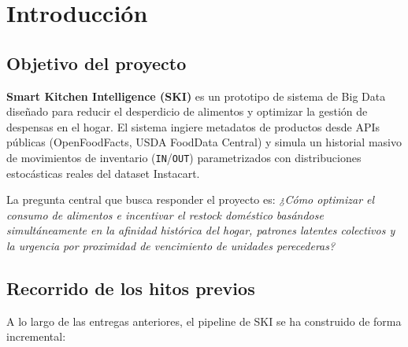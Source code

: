 \documentclass[12pt,a4paper]{article}
\newcommand{\code}[1]{\texttt{\small #1}}
\begin{document}
\tableofcontents
\newpage

\section{Introducción}

\subsection{Objetivo del proyecto}

\textbf{Smart Kitchen Intelligence (SKI)} es un prototipo de sistema de Big Data diseñado para reducir el desperdicio de alimentos y optimizar la gestión de despensas en el hogar. El sistema ingiere metadatos de productos desde APIs públicas (OpenFoodFacts, USDA FoodData Central) y simula un historial masivo de movimientos de inventario (\code{IN}/\code{OUT}) parametrizados con distribuciones estocásticas reales del dataset Instacart.

La pregunta central que busca responder el proyecto es: \textit{¿Cómo optimizar el consumo de alimentos e incentivar el restock doméstico basándose simultáneamente en la afinidad histórica del hogar, patrones latentes colectivos y la urgencia por proximidad de vencimiento de unidades perecederas?}

\subsection{Recorrido de los hitos previos}

A lo largo de las entregas anteriores, el pipeline de SKI se ha construido de forma incremental:
\end{document}
